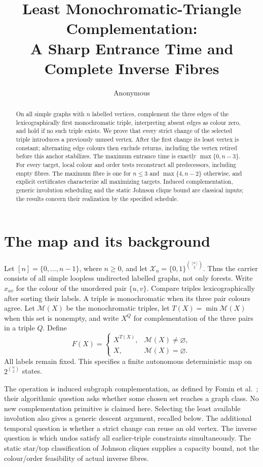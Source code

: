 \documentclass[a4paper,10pt]{amsart}
\title[Least monochromatic-triangle complementation]{Least Monochromatic-Triangle Complementation:\\
A Sharp Entrance Time and Complete Inverse Fibres}
\author{Anonymous}
\date{}
\theoremstyle{remark}
\newcommand{\M}{\mathcal M}
\newcommand{\X}{\mathcal X}
\begin{document}
\begin{abstract}
On all simple graphs with $n$ labelled vertices, complement the three
edges of the lexicographically first monochromatic triple, interpreting
absent edges as colour zero, and hold if no such triple exists. We prove
that every strict change of the selected triple introduces a previously
unused vertex. After the first change its least vertex is constant;
alternating edge colours then exclude returns, including the vertex
retired before this anchor stabilizes. The maximum entrance time is
exactly $\max\{0,n-3\}$. For every target, local colour and order tests
reconstruct all predecessors, including empty fibres. The maximum fibre
is one for $n\le3$ and $\max\{4,n-2\}$ otherwise, and explicit certificates
characterize all maximizing targets. Induced complementation, generic
involution scheduling and the static Johnson clique bound are classical
inputs; the results concern their realization by the specified schedule.
\end{abstract}
\maketitle

\section{The map and its background}

Let $[n]=\{0,\ldots,n-1\}$, where $n\ge0$, and let
$\X_n=\{0,1\}^{\binom{[n]}2}$. Thus the carrier consists of all simple
loopless undirected labelled graphs, not only forests. Write $x_{uv}$ for
the colour of the unordered pair $\{u,v\}$. Compare triples
lexicographically after sorting their labels. A triple is monochromatic
when its three pair colours agree. Let $\M(X)$ be the monochromatic
triples, let $T(X)=\min\M(X)$ when this set is nonempty, and write $X^Q$
for complementation of the three pairs in a triple $Q$. Define
\begin{equation}\label{eq:map}
F(X)=\begin{cases}X^{T(X)},&\M(X)\ne\varnothing,\\
X,&\M(X)=\varnothing.\end{cases}
\end{equation}
All labels remain fixed. This specifies a finite autonomous deterministic
map on $2^{\binom n2}$ states.

The operation is induced subgraph complementation, as defined by
Fomin et al.\ \cite[Section 1]{fomin2020subgraph}; their algorithmic
question asks whether some chosen set reaches a graph class. No new
complementation primitive is claimed here. Selecting the least available
involution also gives a generic descent argument, recalled below. The
additional temporal question is whether a strict change can reuse an old
vertex. The inverse question is which undos satisfy all earlier-triple
constraints simultaneously. The static star/top classification of Johnson
cliques \cite[Section 3]{shuldiner2022clique} supplies a capacity bound,
not the colour/order feasibility of actual inverse fibres.
\end{document}
